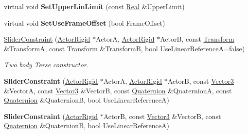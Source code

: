 \begin{DoxyCompactItemize}
\item 
\hypertarget{classMezzanine_1_1SliderConstraint_a1a9b1c823c41cfa2bf27134a9cb86375}{
virtual void {\bfseries SetUpperLinLimit} (const \hyperlink{namespaceMezzanine_a726731b1a7df72bf3583e4a97282c6f6}{Real} \&UpperLimit)}
\label{classMezzanine_1_1SliderConstraint_a1a9b1c823c41cfa2bf27134a9cb86375}

\item 
\hypertarget{classMezzanine_1_1SliderConstraint_a5402cffa565acf077aff46a1e2556bd9}{
virtual void {\bfseries SetUseFrameOffset} (bool FrameOffset)}
\label{classMezzanine_1_1SliderConstraint_a5402cffa565acf077aff46a1e2556bd9}

\item 
\hyperlink{classMezzanine_1_1SliderConstraint_aa94ae163ab1a73a5a92f94172a8abdb3}{SliderConstraint} (\hyperlink{classMezzanine_1_1ActorRigid}{ActorRigid} $\ast$ActorA, \hyperlink{classMezzanine_1_1ActorRigid}{ActorRigid} $\ast$ActorB, const \hyperlink{classMezzanine_1_1Transform}{Transform} \&TransformA, const \hyperlink{classMezzanine_1_1Transform}{Transform} \&TransformB, bool UseLinearReferenceA=false)
\begin{DoxyCompactList}\small\item\em Two body Terse constructor. \item\end{DoxyCompactList}\item 
\hypertarget{classMezzanine_1_1SliderConstraint_aaeb70964ae4b2568a1dd70595f0d8567}{
{\bfseries SliderConstraint} (\hyperlink{classMezzanine_1_1ActorRigid}{ActorRigid} $\ast$ActorA, \hyperlink{classMezzanine_1_1ActorRigid}{ActorRigid} $\ast$ActorB, const \hyperlink{classMezzanine_1_1Vector3}{Vector3} \&VectorA, const \hyperlink{classMezzanine_1_1Vector3}{Vector3} \&VectorB, const \hyperlink{classMezzanine_1_1Quaternion}{Quaternion} \&QuaternionA, const \hyperlink{classMezzanine_1_1Quaternion}{Quaternion} \&QuaternionB, bool UseLinearReferenceA)}
\label{classMezzanine_1_1SliderConstraint_aaeb70964ae4b2568a1dd70595f0d8567}

\item 
\hypertarget{classMezzanine_1_1SliderConstraint_a2f173d23f75cf90a91fbe2542d7ccd10}{
{\bfseries SliderConstraint} (\hyperlink{classMezzanine_1_1ActorRigid}{ActorRigid} $\ast$ActorB, const \hyperlink{classMezzanine_1_1Vector3}{Vector3} \&VectorB, const \hyperlink{classMezzanine_1_1Quaternion}{Quaternion} \&QuaternionB, bool UseLinearReferenceA)}
\label{classMezzanine_1_1SliderConstraint_a2f173d23f75cf90a91fbe2542d7ccd10}


\end{DoxyCompactItemize}

